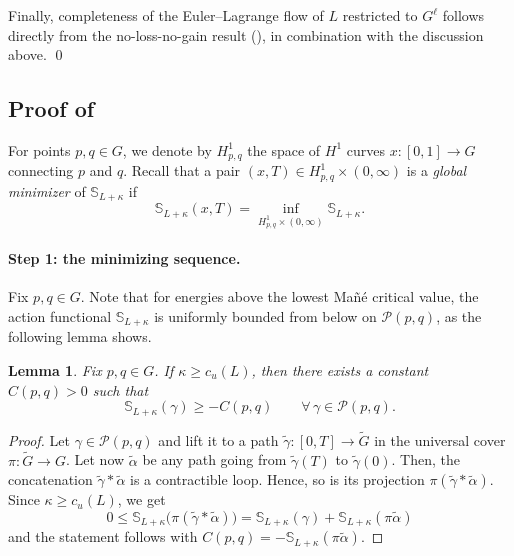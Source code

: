 \documentclass[11pt,reqno]{amsart}
\theoremstyle{plain}
\newtheorem{lem}[thm]{Lemma}
\theoremstyle{definition}
\theoremstyle{plain} %
\newtheorem{lem}[lem]{Lemma}
\theoremstyle{definition} %
\numberwithin{equation}{section}
\def\SS{{\mathbb{S}}}
\begin{document}
Finally, completeness of the Euler--Lagrange flow of \( L \) restricted to \( G^\ell \) follows directly from the no-loss-no-gain result (), in combination with the discussion above. \qed 

\subsection{Proof of }
For points \( p, q \in G \), we denote by \( H^1_{p, q} \) the space of \( H^1 \) curves \( x \colon [0, 1] \to G \) connecting \( p\) and \( q \). Recall that a pair \( (x, T) \in H^1_{p, q} \times (0, \infty) \) is a \textit{global minimizer} of \( \mathbb S_{L+ \kappa} \) if
\begin{equation}
    \mathbb S_{L + \kappa}(x, T) = \inf_{H^1_{p, q} \times (0, \infty)} \mathbb S_{L + \kappa}.
\end{equation}

\paragraph{\textbf{Step 1: the minimizing sequence.}}
Fix \( p, q \in G \). Note that for energies above the 
lowest Mañé critical value, the action functional $\mathbb S_{L+\kappa}$ is uniformly bounded from below on $\mathcal{P}(p, q)$, as the following lemma shows.

\begin{lem}\label{Ilemm: uniform lower bound of Act functional above manes value}
    Fix $p, q \in G$. If $\kappa \geq c_u(L)$, then there exists a constant $C(p,q) > 0$ such that
    \begin{equation*}
        \SS_{L+\kappa}(\gamma) \ge -C(p,q) 
        \qquad \forall\, \gamma \in \mathcal{P}(p,q).
    \end{equation*}
\end{lem}
\begin{proof}
    Let \( \gamma \in \mathcal{P}(p, q) \) and lift it to a path \( \tilde \gamma \colon [0, T] \to \tilde G \) in the universal cover \( \pi \colon \tilde G \to G \). Let now \( \tilde \alpha \) be any path going from \( \tilde \gamma(T) \) to \( \tilde \gamma (0) \). Then, the concatenation \( \tilde \gamma * \tilde \alpha \) is a contractible loop. Hence, so is its projection \( \pi (\tilde \gamma * \tilde \alpha) \). Since \( \kappa \geq c_u(L) \), we get
    \begin{equation*}
        0 \leq \SS_{L + \kappa} \big( \pi (\tilde \gamma * \tilde \alpha) \big) = \SS_{L + \kappa}(\gamma) + \SS_{L + \kappa}(\pi \tilde \alpha)
    \end{equation*}
    and the statement follows with \( C(p, q) = - \mathbb S_{L+ \kappa} (\pi \tilde \alpha) \).
\end{proof}
\end{document}

